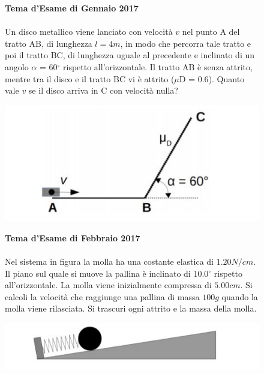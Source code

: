 
\begin{figure}[h!]
\textbf{Tema d'Esame di Gennaio 2017}\\ \\
Un disco metallico viene lanciato con velocità $v$ nel punto A del tratto AB, di lunghezza
$l = 4 m$, in modo che percorra tale tratto e poi il tratto BC, di lunghezza uguale al precedente
e inclinato di un angolo $\alpha$ = 60$^{\circ}$ rispetto all’orizzontale. Il tratto AB è senza attrito, mentre tra il disco e il tratto BC vi è attrito ($\mu$D = $0.6$). Quanto vale $v$ se il disco arriva in C con velocità nulla? 
\\
	\begin{center}
		\includegraphics[scale=0.5]{ES2/GEN022017.jpg}
	\end{center}
\end{figure}


\begin{figure}[h!]
\textbf{Tema d'Esame di Febbraio 2017}\\ \\
Nel sistema in figura la molla ha una costante elastica di $1.20 N/cm$. Il piano sul quale si
muove la pallina è inclinato di 10.0$^{\circ}$ rispetto all’orizzontale. La molla viene inizialmente compressa di $5.00 cm$. Si calcoli la velocità che raggiunge una pallina di massa $100 g$ quando la molla viene rilasciata. Si trascuri ogni attrito e la massa della molla.
\\
	\begin{center}
		\includegraphics[scale=0.5]{ES2/FEB022017.jpg}
	\end{center}
\end{figure}


